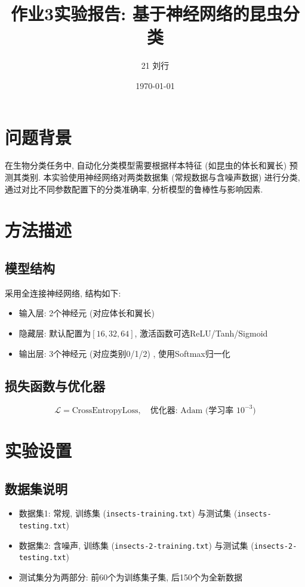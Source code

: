 \documentclass{article}
\title{作业3实验报告: 基于神经网络的昆虫分类}
\author{21 刘行}
\date{\today}
\begin{document}
\maketitle

\section{问题背景}
在生物分类任务中, 自动化分类模型需要根据样本特征 (如昆虫的体长和翼长) 预测其类别. 本实验使用神经网络对两类数据集 (常规数据与含噪声数据) 进行分类, 通过对比不同参数配置下的分类准确率, 分析模型的鲁棒性与影响因素.

\section{方法描述}
\subsection{模型结构}
采用全连接神经网络, 结构如下:
\begin{itemize}
    \item 输入层: 2个神经元 (对应体长和翼长) 
    \item 隐藏层: 默认配置为$[16, 32, 64]$, 激活函数可选ReLU/Tanh/Sigmoid
    \item 输出层: 3个神经元 (对应类别0/1/2) , 使用Softmax归一化
\end{itemize}

\subsection{损失函数与优化器}
\begin{equation}
    \mathcal{L} = \text{CrossEntropyLoss}, \quad \text{优化器: Adam (学习率 } 10^{-3}\text{)}
\end{equation}

\section{实验设置}
\subsection{数据集说明}
\begin{itemize}
    \item 数据集1: 常规, 训练集 (\texttt{insects-training.txt}) 与测试集 (\texttt{insects-testing.txt})
    \item 数据集2: 含噪声, 训练集 (\texttt{insects-2-training.txt}) 与测试集 (\texttt{insects-2-testing.txt})
    \item 测试集分为两部分: 前60个为训练集子集, 后150个为全新数据
\end{itemize}
\end{document}

